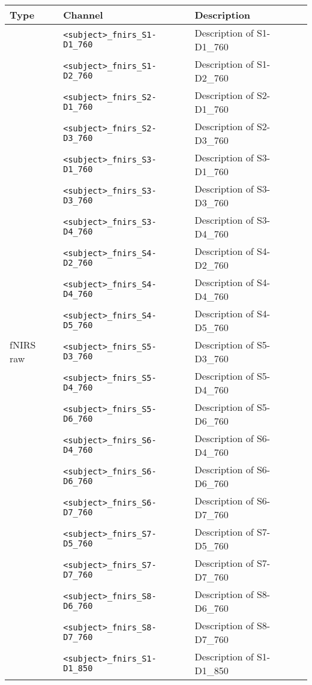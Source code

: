 \begin{table}
\centering
\begin{tabularx}{\textwidth}{|l|l|X|}
\hline
\textbf{Type} & \textbf{Channel} & \textbf{Description} \\
\hline
\multirow{40}{*}{fNIRS raw}
& \texttt{<subject>\_fnirs\_S1-D1\_760} & Description of S1-D1\_760 \\
& \texttt{<subject>\_fnirs\_S1-D2\_760} & Description of S1-D2\_760 \\
& \texttt{<subject>\_fnirs\_S2-D1\_760} & Description of S2-D1\_760 \\
& \texttt{<subject>\_fnirs\_S2-D3\_760} & Description of S2-D3\_760 \\
& \texttt{<subject>\_fnirs\_S3-D1\_760} & Description of S3-D1\_760 \\
& \texttt{<subject>\_fnirs\_S3-D3\_760} & Description of S3-D3\_760 \\
& \texttt{<subject>\_fnirs\_S3-D4\_760} & Description of S3-D4\_760 \\
& \texttt{<subject>\_fnirs\_S4-D2\_760} & Description of S4-D2\_760 \\
& \texttt{<subject>\_fnirs\_S4-D4\_760} & Description of S4-D4\_760 \\
& \texttt{<subject>\_fnirs\_S4-D5\_760} & Description of S4-D5\_760 \\
& \texttt{<subject>\_fnirs\_S5-D3\_760} & Description of S5-D3\_760 \\
& \texttt{<subject>\_fnirs\_S5-D4\_760} & Description of S5-D4\_760 \\
& \texttt{<subject>\_fnirs\_S5-D6\_760} & Description of S5-D6\_760 \\
& \texttt{<subject>\_fnirs\_S6-D4\_760} & Description of S6-D4\_760 \\
& \texttt{<subject>\_fnirs\_S6-D6\_760} & Description of S6-D6\_760 \\
& \texttt{<subject>\_fnirs\_S6-D7\_760} & Description of S6-D7\_760 \\
& \texttt{<subject>\_fnirs\_S7-D5\_760} & Description of S7-D5\_760 \\
& \texttt{<subject>\_fnirs\_S7-D7\_760} & Description of S7-D7\_760 \\
& \texttt{<subject>\_fnirs\_S8-D6\_760} & Description of S8-D6\_760 \\
& \texttt{<subject>\_fnirs\_S8-D7\_760} & Description of S8-D7\_760 \\
& \texttt{<subject>\_fnirs\_S1-D1\_850} & Description of S1-D1\_850 \\

\end{tabularx}
\end{table}
